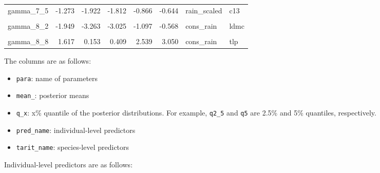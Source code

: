 \documentclass[
  11pt,
  letterpaper,
  DIV=11,
  numbers=noendperiod]{scrartcl}
\providecommand{\tightlist}{%
  \setlength{\itemsep}{0pt}\setlength{\parskip}{0pt}}\usepackage{longtable,booktabs,array}
\begin{document}
\begin{longtable}[t]{lrrrrrll}
gamma\_7\_5 & -1.273 & -1.922 & -1.812 & -0.866 & -0.644 & rain\_scaled & c13\\
\cellcolor{gray!6}{gamma\_8\_11} & \cellcolor{gray!6}{-1.036} & \cellcolor{gray!6}{-1.965} & \cellcolor{gray!6}{-1.796} & \cellcolor{gray!6}{-0.465} & \cellcolor{gray!6}{-0.106} & \cellcolor{gray!6}{cons\_rain} & \cellcolor{gray!6}{log\_lt}\\
gamma\_8\_2 & -1.949 & -3.263 & -3.025 & -1.097 & -0.568 & cons\_rain & ldmc\\
\cellcolor{gray!6}{gamma\_8\_5} & \cellcolor{gray!6}{-1.645} & \cellcolor{gray!6}{-2.643} & \cellcolor{gray!6}{-2.476} & \cellcolor{gray!6}{-0.979} & \cellcolor{gray!6}{-0.615} & \cellcolor{gray!6}{cons\_rain} & \cellcolor{gray!6}{c13}\\
\addlinespace
gamma\_8\_8 & 1.617 & 0.153 & 0.409 & 2.539 & 3.050 & cons\_rain & tlp\\*
\end{longtable}

The columns are as follows:

\begin{itemize}
\tightlist
\item
  \texttt{para}: name of parameters
\item
  \texttt{mean\_}: posterior means
\item
  \texttt{q\_x}: x\% quantile of the posterior distributions. For
  example, \texttt{q2\_5} and \texttt{q5} are 2.5\% and 5\% quantiles,
  respectively.
\item
  \texttt{pred\_name}: individual-level predictors
\item
  \texttt{tarit\_name}: species-level predictors
\end{itemize}

Individual-level predictors are as follows:
\end{document}
